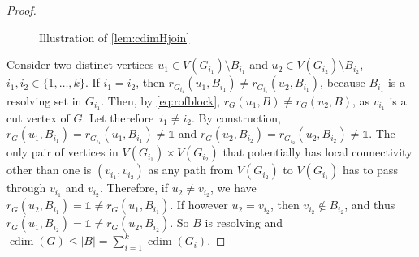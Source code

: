 \documentclass[letterpaper,12pt,headings=normal,parskip=half]{scrartcl}
\DeclareMathOperator{\cdim}{cdim}
\theoremstyle{definition}
\begin{document}
\begin{proof}
\begin{figure}
    \caption{Illustration of \cref{lem:cdimHjoin}}
    \label{fig:Hjoin}
\end{figure}

    Consider two distinct vertices $u_1\in V(G_{i_1})\setminus B_{i_1}$ and $u_2\in V(G_{i_2})\setminus B_{i_2}$, $i_1,i_2\in\{1,\ldots,k\}$.
    If $i_1=i_2$, then $r_{G_{i_1}}(u_1,B_{i_1})\neq r_{G_{i_1} }(u_2,B_{i_1})$, because $B_{i_1}$ is a resolving set in $G_{i_1}$.
    Then, by \cref{eq:rofblock}, $r_{G}(u_1,B)\neq r_{G}(u_2,B)$, as $v_{i_1}$ is a cut vertex of $G$.
    Let therefore~$i_1\neq i_2$.
    By construction, $r_G(u_1,B_{i_1})=r_{G_{i_1}}(u_1,B_{i_1})\neq\mathds{1}$ and $r_G(u_2,B_{i_2})=r_{G_{i_2}}(u_2,B_{i_2})\neq\mathds{1}$. 
    The only pair of vertices in $V(G_{i_1})\times V(G_{i_2})$ that potentially has local connectivity other than one is $(v_{i_1},v_{i_2})$ as any path from $V(G_{i_2})$ to $V(G_{i_1})$ has to pass through $v_{i_1}$ and $v_{i_2}$. 
    Therefore, if $u_2\neq v_{i_2}$, we have $r_G(u_2,B_{i_1})=\mathds{1}\neq r_G(u_1,B_{i_1})$. 
    If however $u_2=v_{i_2}$, then $v_{i_2}\not\in B_{i_2}$, and thus $r_G(u_1,B_{i_2})=\mathds{1}\neq r_G(u_2,B_{i_2})$. 
    So $B$ is resolving and $\cdim(G)\leq|B|=\sum_{i=1}^k\cdim(G_i)$.


\end{proof}
\end{document}
